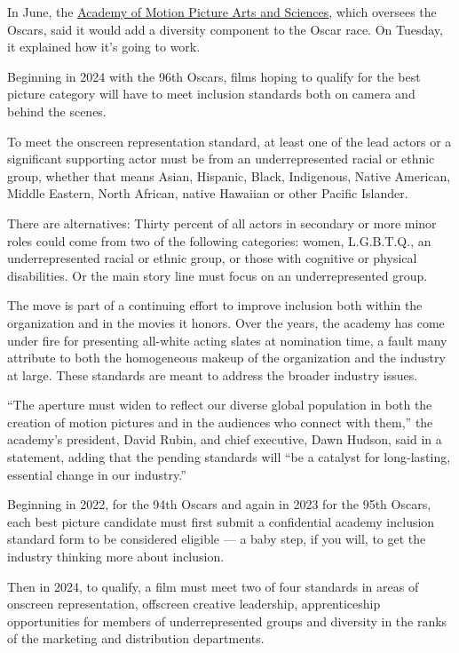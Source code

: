 In June, the
\href{https://www.nytimes3xbfgragh.onion/2020/06/12/movies/oscars-diversity-rule.html}{Academy
of Motion Picture Arts and Sciences}, which oversees the Oscars, said it
would add a diversity component to the Oscar race. On Tuesday, it
explained how it's going to work.

Beginning in 2024 with the 96th Oscars, films hoping to qualify for the
best picture category will have to meet inclusion standards both on
camera and behind the scenes.

To meet the onscreen representation standard, at least one of the lead
actors or a significant supporting actor must be from an
underrepresented racial or ethnic group, whether that means Asian,
Hispanic, Black, Indigenous, Native American, Middle Eastern, North
African, native Hawaiian or other Pacific Islander.

There are alternatives: Thirty percent of all actors in secondary or
more minor roles could come from two of the following categories: women,
L.G.B.T.Q., an underrepresented racial or ethnic group, or those with
cognitive or physical disabilities. Or the main story line must focus on
an underrepresented group.

The move is part of a continuing effort to improve inclusion both within
the organization and in the movies it honors. Over the years, the
academy has come under fire for presenting all-white acting slates at
nomination time, a fault many attribute to both the homogeneous makeup
of the organization and the industry at large. These standards are meant
to address the broader industry issues.

``The aperture must widen to reflect our diverse global population in
both the creation of motion pictures and in the audiences who connect
with them,'' the academy's president, David Rubin, and chief executive,
Dawn Hudson, said in a statement, adding that the pending standards will
``be a catalyst for long-lasting, essential change in our industry.''

Beginning in 2022, for the 94th Oscars and again in 2023 for the 95th
Oscars, each best picture candidate must first submit a confidential
academy inclusion standard form to be considered eligible --- a baby
step, if you will, to get the industry thinking more about inclusion.

Then in 2024, to qualify, a film must meet two of four standards in
areas of onscreen representation, offscreen creative leadership,
apprenticeship opportunities for members of underrepresented groups and
diversity in the ranks of the marketing and distribution departments.

